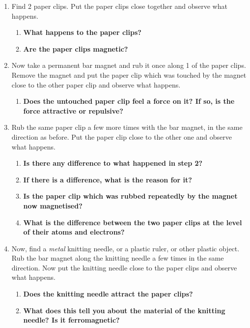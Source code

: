 {
\begin{enumerate}
\item Find 2 paper clips. Put the paper clips close together and observe what happens. \\
  \begin{enumerate}
  \item \textbf{What happens to the paper clips?}
  \item \textbf{Are the paper clips magnetic?} 
  \end{enumerate}

\item Now take a permanent bar magnet and rub it once along 1 of the paper clips. Remove the magnet and put the paper clip which was touched by the magnet close to the other paper clip and observe what happens.\\
  \begin{enumerate}
  \item \textbf{Does the untouched paper clip feel a force on it? If so, is the force attractive or repulsive?}
  \end{enumerate}

\item Rub the same paper clip a few more times with the bar magnet, in the same direction as before. Put the paper clip close to the other one and observe what happens.\\
  \begin{enumerate}
  \item \textbf{Is there any difference to what happened in step 2?}
  \item \textbf{If there is a difference, what is the reason for it?}
  \item \textbf{Is the paper clip which was rubbed repeatedly by the magnet now magnetised?}
  \item \textbf{What is the difference between the two paper clips at the level of their atoms and electrons?}
  \end{enumerate}

\item Now, find a \textit{metal} knitting needle, or a plastic ruler, or other plastic object. Rub the bar magnet along the knitting needle a few times in the same direction. Now put the knitting needle close to the paper clips and observe what happens.\\
  \begin{enumerate}
  \item \textbf{Does the knitting needle attract the paper clips?}
  \item \textbf{What does this tell you about the material of the knitting needle? Is it ferromagnetic?}
  \end{enumerate}


\end{enumerate}}
